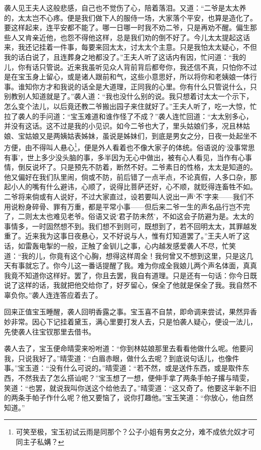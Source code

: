 \documentclass[12pt,oneside]{book}
\begin{document}
袭人见王夫人这般悲感，自己也不觉伤了心，陪着落泪。又道：“二爷是太太养的，太太岂不心疼。便是我们做下人的服侍一场，大家落个平安，也算是造化了。要这样起来，连平安都不能了。哪一日哪一时我不劝二爷，只是再劝不醒。偏生那些人又肯亲近他，也怨不得他这样，总是我们劝的倒不好了。今儿太太提起这话来，我还记挂着一件事，每要来回太太，讨太太个主意。只是我怕太太疑心，不但我的话白说了，且连葬身之地都没了。”王夫人听了这话内有因，忙问道：“我的儿，你有话只管说。近来我虽听见众人背前背后都夸你，我还信不真，只怕你不过是在宝玉身上留心，或是诸人跟前和气，这些小意思好，所以将你和老姨娘一体行事。谁知你方才和我说的话全是大道理，正同我的心里。你有什么只管说什么，只别教别人知道就是了。”袭人道：“我也没什么别的说。我只想着讨太太一个示下，怎么变个法儿，以后竟还教二爷搬出园子来住就好了。”王夫人听了，吃一大惊，忙拉了袭人的手问道：“宝玉难道和谁作怪了不成？”袭人连忙回道：“太太别多心，并没有这话。这不过是我的小见识。如今二爷也大了，里头姑娘们多，况且林姑娘、宝姑娘又是两姨姑表姊妹，虽说是姊妹们，到底是男女之分，日夜一处起坐不方便，由不得叫人悬心\footnote{可笑至极，宝玉初试云雨是同那个？公子小姐有男女之分，难不成依允奴才可同主子私媾？}，便是外人看着也不像大家子的体统。俗语说的‘没事常思有事’，世上多少没头脑的事，多半因为无心中做出，被有心人看见，当作有心事情，倒反说坏了。只是预先不防着，断然不好。二爷素日的性格，太太是知道的。他又偏好在我们队里闹，倘或不防，前后错了一点半点，不论真假，人多口杂，那起小人的嘴有什么避讳，心顺了，说得比菩萨还好，心不顺，就贬得连畜牲不如。二爷将来倘或有人说好，不过大家直过，设若要叫人说出一声‘不’字来——我们不用说粉身碎骨、罪有万重，都是平常小事——但后来二爷一生的声名品行岂不完了，二则太太也难见老爷。俗语又说‘君子防未然’，不如这会子防避为是。太太的事情多，一时固然想不到。我们想不到则可，既想到了，若不回明太太，其罪越发重了。近来我为这事日夜悬心，又不好说与人，惟有灯知道罢了。”王夫人听了这话，如雷轰电掣的一般，正触了金钏儿之事，心内越发感爱袭人不尽，忙笑道：“我的儿，你竟有这个心胸，想得这样周全！我何曾又不想到这里，只是这几天有事就忘了。你今儿这一番话提醒了我。难为你成全我娘儿两个声名体面，真真我竟不知道你这样好。罢了，你且去罢，我自有道理。只是还有一句话：你今日既说了这样的话，我就把他交给你了，好歹留心，保全了他就是保全了我。我自然不辜负你。”袭人连连答应着去了。

回来正值宝玉睡醒，袭人回明香露之事。宝玉喜不自禁，即命调来尝试，果然异香妙非常。因心下记挂着黛玉，满心里要打发人去，只是怕袭人疑心，便设一法儿，先使袭人往宝钗那里去借书。

袭人去了，宝玉便命晴雯来吩咐道：“你到林姑娘那里去看看他做什么呢。他要问我，只说我好了。”晴雯道：“白眉赤眼，做什么去呢？到底说句话儿，也像件事。”宝玉道：“没有什么可说的。”晴雯道：“若不然，或是送件东西，或是取件东西，不然我去了怎么搭讪呢？”宝玉想了一想，便伸手拿了两条手帕子撂与晴雯，笑道：“也罢，就说我叫你送这个给他去了。”晴雯道：“这又奇了。他要这半新不旧的两条手帕子作什么呢？他又要恼了，说你打趣他。”宝玉笑道：“你放心，他自然知道。”
\end{document}
